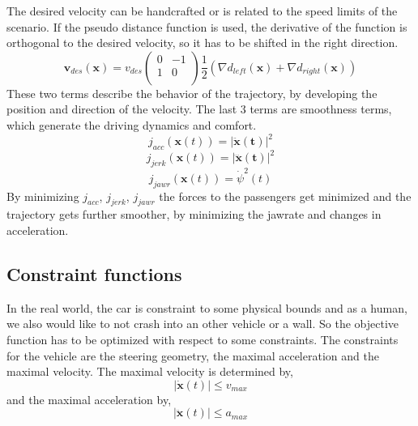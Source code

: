 \documentclass[conference]{IEEEtran}
\begin{document}
The desired velocity can be handcrafted or is related to the speed limits of the scenario. If the pseudo distance function is used, the derivative of the function is orthogonal to the desired velocity, so it has to be shifted in the right direction.
$$
\mathbf{v}_{des} (\mathbf{x}) = v_{des} \begin{pmatrix}
0 & -1 \\
1 & 0 \\
\end{pmatrix} \frac{1}{2} \left(\nabla d_{left}(\mathbf{x}) + \nabla d_{right}(\mathbf{x})\right)
$$
These two terms describe the behavior of the trajectory, by developing the position and direction of the velocity. The last 3 terms are smoothness terms, which generate the driving dynamics and comfort.
$$
j_{acc}(\mathbf{x}(t)) = \left| \mathbf{\ddot{x}(t)} \right|^2 
$$
$$
j_{jerk} (\mathbf{x}(t)) = \left| \mathbf{\dddot{x}(t)} \right|^2 
$$
$$
j_{jawr} (\mathbf{x}(t)) =\dot{\psi}^2(t) 
$$
By minimizing $j_{acc}$, $j_{jerk}$, $j_{jawr}$ the forces to the passengers get minimized and the trajectory gets further smoother, by minimizing the jawrate and changes in acceleration.
\subsection{Constraint functions}
In the real world, the car is constraint to some physical bounds and as a human, we also would like to not crash into an other vehicle or a wall. So the objective function has to be optimized with respect to some constraints. The constraints for the vehicle are the steering geometry, the maximal acceleration and the maximal velocity.
The maximal velocity is determined by,
$$|\mathbf{\dot{x}}(t)| \leq v_{max}$$
and the maximal acceleration by, 
$$|\mathbf{\ddot{x}}(t)| \leq a_{max}$$
\end{document}
